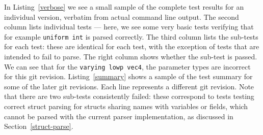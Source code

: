 \documentclass[12pt,twoside,notitlepage]{report}
\begin{document}
In Listing~\ref{verbose} we see a small sample of the complete test results for an individual version, verbatim from actual command line output. The second column lists individual tests --- here, we see some very basic tests verifying that for example \texttt{uniform int} is parsed correctly. The third column lists the sub-tests for each test: these are identical for each test, with the exception of tests that are intended to fail to parse. The right column shows whether the sub-test is passed. We can see that for the \texttt{varying lowp vec4}, the parameter types are incorrect for this git revision. Listing~\ref{summary} shows a sample of the test summary for some of the later git revisions. Each line represents a different git revision. Note that there are two sub-tests consistently failed: these correspond to tests testing correct struct parsing for structs sharing names with variables or fields, which cannot be parsed with the current parser implementation, as discussed in Section~\ref{struct-parse}.
\end{document}

